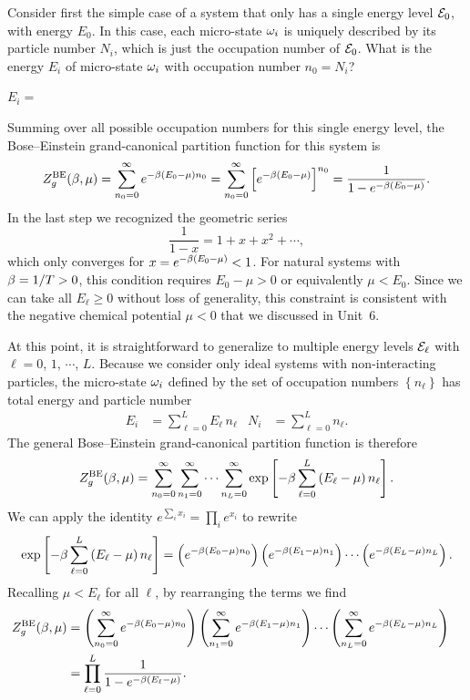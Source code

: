 Consider first the simple case of a system that only has a single energy level $\mathcal E_0$, with energy $E_0$.
In this case, each micro-state $\omega_i$ is uniquely described by its particle number $N_i$, which is just the occupation number of $\mathcal E_0$.
What is the energy $E_i$ of micro-state $\omega_i$ with occupation number $n_0 = N_i$?
\begin{mdframed}
  $E_i = $ \\[24 pt]
\end{mdframed}
Summing over all possible occupation numbers for this single energy level, the Bose--Einstein grand-canonical partition function for this system is
\begin{equation}
  \label{eq:BEsingle}
  Z_g^{\text{BE}}(\beta, \mu) = \sum_{n_0 = 0}^{\infty} e^{-\beta (E_0 - \mu) n_0} = \sum_{n_0 = 0}^{\infty} \left[e^{-\beta (E_0 - \mu)}\right]^{n_0} = \frac{1}{1 - e^{-\beta (E_0 - \mu)}}.
\end{equation}
In the last step we recognized the geometric series
\begin{equation*}
  \frac{1}{1 - x} = 1 + x + x^2 + \cdots,
\end{equation*}
which only converges for $x = e^{-\beta (E_0 - \mu)} < 1$.
For natural systems with $\beta = 1 / T > 0$, this condition requires $E_0 - \mu > 0$ or equivalently $\mu < E_0$.
Since we can take all $E_{\ell} \geq 0$ without loss of generality, this constraint is consistent with the negative chemical potential $\mu < 0$ that we discussed in Unit~6.

At this point, it is straightforward to generalize to multiple energy levels $\mathcal E_{\ell}$ with $\ell = 0$, $1$, $\cdots$, $L$.
Because we consider only ideal systems with non-interacting particles, the micro-state $\omega_i$ defined by the set of occupation numbers $\left\{n_{\ell}\right\}$ has total energy and particle number
\begin{align}
  \label{eq:total_energy_levels}
  E_i & = \sum_{\ell = 0}^L E_{\ell} \, n_{\ell} &
  N_i & = \sum_{\ell = 0}^L n_{\ell}.
\end{align}
The general Bose--Einstein grand-canonical partition function is therefore
\begin{equation*}
  Z_g^{\text{BE}}(\beta, \mu) = \sum_{n_0 = 0}^{\infty} \sum_{n_1 = 0}^{\infty} \cdots \sum_{n_L = 0}^{\infty} \exp\left[-\beta\sum_{\ell = 0}^L \left(E_{\ell} - \mu\right) n_{\ell}\right].
\end{equation*}
We can apply the identity $e^{\sum_i x_i} = \prod_i e^{x_i}$ to rewrite
\begin{equation*}
  \exp\left[-\beta\sum_{\ell = 0}^L \left(E_{\ell} - \mu\right) n_{\ell}\right] = \left(e^{-\beta (E_0 - \mu) n_0}\right) \left(e^{-\beta (E_1 - \mu) n_1}\right)\cdots \left(e^{-\beta (E_L - \mu) n_L}\right).
\end{equation*}
Recalling $\mu < E_{\ell}$ for all $\ell$, by rearranging the terms we find
\begin{align}
  Z_g^{\text{BE}}(\beta, \mu) & = \left(\sum_{n_0 = 0}^{\infty} e^{-\beta (E_0 - \mu) n_0}\right) \left(\sum_{n_1 = 0}^{\infty} e^{-\beta (E_1 - \mu) n_1}\right)\cdots \left(\sum_{n_L = 0}^{\infty} e^{-\beta (E_L - \mu) n_L}\right) \cr
                 & = \prod_{\ell = 0}^L \frac{1}{1 - e^{-\beta (E_{\ell} - \mu)}}. \label{eq:partfunc_BE}
\end{align}

